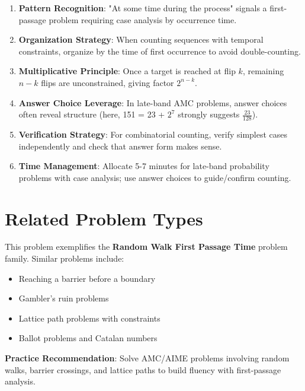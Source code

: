 \documentclass[]{article}
\begin{document}
\begin{enumerate}
    \item \textbf{Pattern Recognition}: "At some time during the process" signals a first-passage problem requiring case analysis by occurrence time.
    
    \item \textbf{Organization Strategy}: When counting sequences with temporal constraints, organize by the time of first occurrence to avoid double-counting.
    
    \item \textbf{Multiplicative Principle}: Once a target is reached at flip $k$, remaining $n-k$ flips are unconstrained, giving factor $2^{n-k}$.
    
    \item \textbf{Answer Choice Leverage}: In late-band AMC problems, answer choices often reveal structure (here, 151 = 23 + $2^7$ strongly suggests $\frac{23}{128}$).
    
    \item \textbf{Verification Strategy}: For combinatorial counting, verify simplest cases independently and check that answer form makes sense.
    
    \item \textbf{Time Management}: Allocate 5-7 minutes for late-band probability problems with case analysis; use answer choices to guide/confirm counting.
\end{enumerate}

\section*{Related Problem Types}

This problem exemplifies the \textbf{Random Walk First Passage Time} problem family. Similar problems include:
\begin{itemize}
    \item Reaching a barrier before a boundary
    \item Gambler's ruin problems
    \item Lattice path problems with constraints
    \item Ballot problems and Catalan numbers
\end{itemize}

\textbf{Practice Recommendation}: Solve AMC/AIME problems involving random walks, barrier crossings, and lattice paths to build fluency with first-passage analysis.
\end{document}
